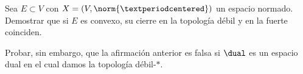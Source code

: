 \begin{problem}[5] Sea $E ⊂ V$ con $X = (V, \norm{·})$ un espacio normado. Demostrar que si $E$ es convexo, su cierre en la topología débil y en la fuerte coinciden. 

Probar, sin embargo, que la afirmación anterior es falsa si $\dual$ es un espacio dual en el cual damos la topología débil-$*$. 

\solution


\end{problem}

